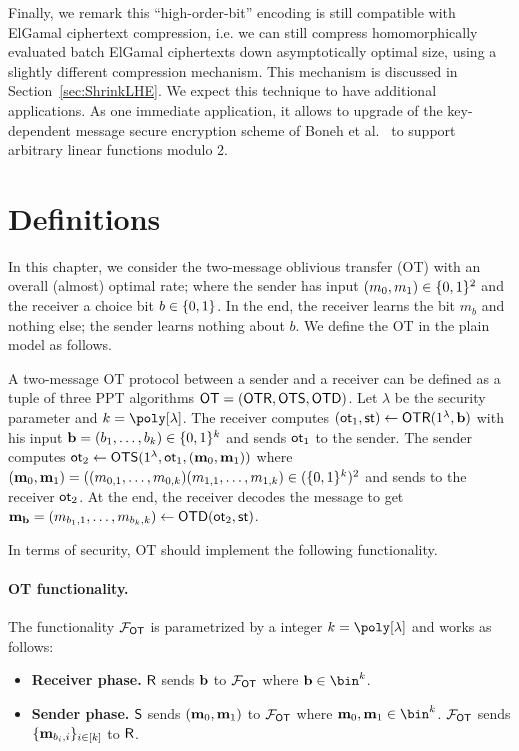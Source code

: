 Finally, we remark this ``high-order-bit'' encoding is still compatible with ElGamal ciphertext compression, i.e. we can still compress homomorphically evaluated batch ElGamal ciphertexts down asymptotically optimal size, using a slightly different compression mechanism. This mechanism is discussed in Section~\ref{sec:ShrinkLHE}. We expect this technique to have additional applications. As one immediate application, it allows to upgrade of the key-dependent message secure encryption scheme of Boneh et al.~\cite{C:BHHO08} to support arbitrary linear functions modulo 2.

\section{Definitions}
In this chapter, we consider the two-message oblivious transfer (OT) with an overall (almost) optimal rate; where the sender has input $(m_0,m_1)\in\{0,1\}^2$ and the receiver a choice bit $b\in\{0,1\}$. In the end, the receiver learns the bit $m_b$ and nothing else; the sender learns nothing about $b$. We define the OT in the plain model as follows.
\begin{definition}
A two-message OT protocol between a sender and a receiver can be defined as a tuple of three PPT algorithms $\mathsf{OT}=(\mathsf{OTR},\mathsf{OTS},\mathsf{OTD})$. Let $\lambda$ be the security parameter and $k=\poly[\lambda]$. The receiver computes $(\mathsf{ot}_1,\mathsf{st})\gets\mathsf{OTR}(1^\lambda,\mathbf{b})$ with his input $\mathbf{b}=(b_1,\dots,b_k)\in\{0,1\}^k$ and sends $\mathsf{ot}_1$ to the sender. The sender computes $\mathsf{ot}_2\gets\mathsf{OTS}(1^\lambda,\mathsf{ot}_1, (\mathbf{m}_0,\mathbf{m}_1))$ where $(\mathbf{m}_0,\mathbf{m}_1)=((m_{0,1},\dots,m_{0,k})(m_{1,1},\dots,m_{1,k})\in(\{0,1\}^k)^2$ and sends to the receiver $\mathsf{ot}_2$. At the end, the receiver decodes the message to get $\mathbf{m}_{\mathbf{b}}=(m_{b_1,1},\dots,m_{b_k,k})\gets\mathsf{OTD}(\mathsf{ot}_2,\mathsf{st})$.
\end{definition}


In terms of security, OT should implement the following functionality.
\paragraph{OT functionality.}  The functionality $\mathcal{F}_{\mathsf{OT}}$ is parametrized by a integer $k=\poly[\lambda]$ and works as follows:
\begin{itemize}
    \item \textbf{Receiver phase.} $\mathsf{R}$ sends $\mathbf{b}$ to  $\mathcal{F}_{\mathsf{OT}}$ where $\bn\in\bin^k$. %

  \item \textbf{Sender phase.}
      $\mathsf{S}$ sends $(\mathbf{m}_0,\mathbf{m}_1)$ to $\mathcal{F}_{\mathsf{OT}}$ where $\mn_0,\mn_1\in\bin^k$. $\mathcal{F}_{\mathsf{OT}}$ sends $\{\mathbf{m}_{b_i,i}\}_{i\in[k]}$ to $\mathsf{R}$. %
\end{itemize}

